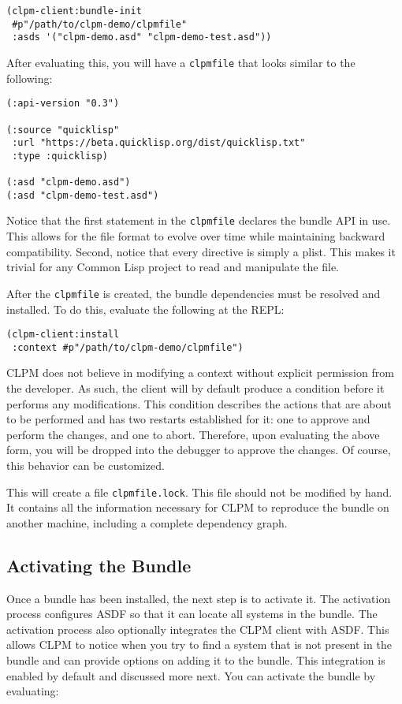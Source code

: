 \documentclass[format=sigconf]{acmart}
\begin{document}
\begin{verbatim}
(clpm-client:bundle-init
 #p"/path/to/clpm-demo/clpmfile"
 :asds '("clpm-demo.asd" "clpm-demo-test.asd"))
\end{verbatim}


After evaluating this, you will have a {\tt clpmfile} that looks similar to the
following:

\begin{verbatim}
(:api-version "0.3")

(:source "quicklisp"
 :url "https://beta.quicklisp.org/dist/quicklisp.txt"
 :type :quicklisp)

(:asd "clpm-demo.asd")
(:asd "clpm-demo-test.asd")
\end{verbatim}

Notice that the first statement in the {\tt clpmfile} declares the bundle API
in use. This allows for the file format to evolve over time while maintaining
backward compatibility. Second, notice that every directive is simply a
plist. This makes it trivial for any Common Lisp project to read and manipulate
the file.

After the {\tt clpmfile} is created, the bundle dependencies must be resolved
and installed. To do this, evaluate the following at the REPL:

\begin{verbatim}
(clpm-client:install
 :context #p"/path/to/clpm-demo/clpmfile")
\end{verbatim}

CLPM does not believe in modifying a context without explicit permission from
the developer. As such, the client will by default produce a condition before
it performs any modifications. This condition describes the actions that are
about to be performed and has two restarts established for it: one to approve
and perform the changes, and one to abort. Therefore, upon evaluating the above
form, you will be dropped into the debugger to approve the changes. Of course,
this behavior can be customized.

This will create a file {\tt clpmfile.lock}. This file should not be modified
by hand. It contains all the information necessary for CLPM to reproduce the
bundle on another machine, including a complete dependency graph.

\subsection{Activating the Bundle}

Once a bundle has been installed, the next step is to activate it. The
activation process configures ASDF so that it can locate all systems in the
bundle. The activation process also optionally integrates the CLPM client with
ASDF. This allows CLPM to notice when you try to find a system that is not
present in the bundle and can provide options on adding it to the bundle. This
integration is enabled by default and discussed more next. You can activate the
bundle by evaluating:
\end{document}
